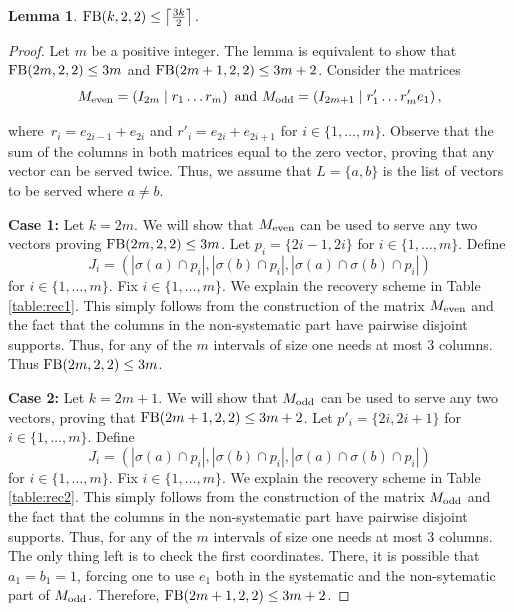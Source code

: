 \documentclass[11pt,a4paper]{article}
\theoremstyle{definition}
\newtheorem{lemma}[theorem]{Lemma}
\newcommand{\fb}{\textnormal{FB}}
\begin{document}
\begin{lemma}
\label{lem:upper_bound_t=2}
$\fb(k,2,2) \le \left\lceil \frac{3k}{2} \right\rceil.$
\end{lemma}
\begin{proof}
Let $m$ be a positive integer. The lemma is equivalent to show that $\fb(2m,2,2) \le 3m$ and $\fb(2m+1,2,2) \le 3m+2$. Consider the matrices
$$M_{\textnormal{even}} = \left( I_{2m} \mid r_1 \ldots r_m\right) \mbox{ and }M_{\textnormal{odd}} = \left( I_{2m+1} \mid r'_1 \ldots r'_m e_1\right),$$

where~$r_i = e_{2i-1}+e_{2i}$ and $r'_i = e_{2i}+e_{2i+1}$ for $i \in \{1,\ldots,m\}$. Observe that the sum of the columns in both matrices equal to the zero vector, proving that any vector can be served twice. Thus, we assume that $L =\{a,b\}$ is the list of vectors to be served where $a \neq b$. 

\textbf{Case 1: }Let $k=2m$. We will show that $M_{\textnormal{even}}$ can be used to serve any two vectors proving $\fb(2m,2,2) \le 3m$. Let $p_i = \{2i-1,2i\}$ for $i \in \{1,\ldots,m\}$. Define $$J_i =(|\sigma(a) \cap p_i|,|\sigma(b) \cap p_i|,|\sigma(a) \cap \sigma(b) \cap p_i|)$$ for $i \in \{1,\ldots,m\}$.
Fix $i \in \{1,\ldots,m\}$. We explain the recovery scheme in Table \ref{table:rec1}. This simply follows from the construction of the matrix $M_{\textnormal{even}}$ and the fact that the columns in the non-systematic part have pairwise disjoint supports. Thus, for any of the $m$ intervals of size one needs at most 3 columns. Thus $\fb(2m,2,2) \le 3m$.

\textbf{Case 2: }Let $k=2m+1$. We will show that $M_{\textnormal{odd}}$ can be used to serve any two vectors, proving that $\fb(2m+1,2,2) \le 3m+2$. Let $p'_i = \{2i,2i+1\}$ for $i \in \{1,\ldots,m\}$. Define $$J_i =(|\sigma(a) \cap p_i|,|\sigma(b) \cap p_i|,|\sigma(a) \cap \sigma(b) \cap p_i|)$$ for $i \in \{1,\ldots,m\}$. Fix $i \in \{1,\ldots,m\}$. We explain the recovery scheme in Table \ref{table:rec2}. This simply follows from the construction of the matrix $M_{\textnormal{odd}}$ and the fact that the columns in the non-systematic part have pairwise disjoint supports. Thus, for any of the $m$ intervals of size one needs at most 3 columns. The only thing left is to check the first coordinates. There, it is possible that $a_1=b_1=1$, forcing one to use $e_1$ both in the systematic and the non-sytematic part of $M_{\textnormal{odd}}$. Therefore, $\fb(2m+1,2,2) \le 3m+2$. \qedhere



\end{proof}
\end{document}
